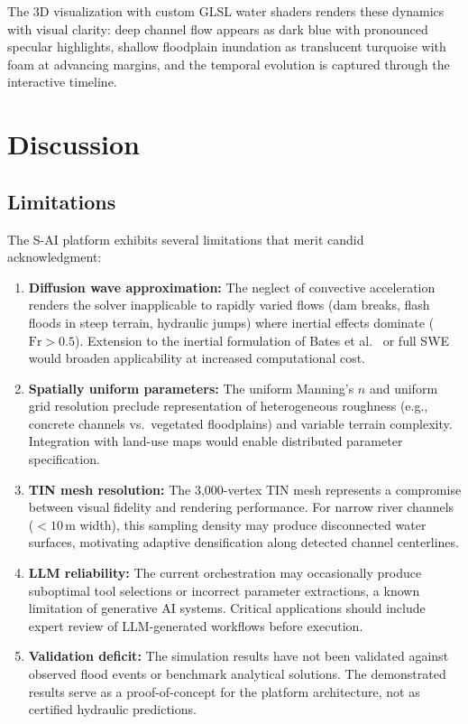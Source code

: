 \documentclass[11pt, a4paper]{article}
\begin{document}
The 3D visualization with custom GLSL water shaders renders these dynamics with visual clarity: deep channel flow appears as dark blue with pronounced specular highlights, shallow floodplain inundation as translucent turquoise with foam at advancing margins, and the temporal evolution is captured through the interactive timeline.

\section{Discussion}
\label{sec:discuss}

\subsection{Limitations}

The S-AI platform exhibits several limitations that merit candid acknowledgment:

\begin{enumerate}[leftmargin=1.5em]
  \item \textbf{Diffusion wave approximation:} The neglect of convective acceleration renders the solver inapplicable to rapidly varied flows (dam breaks, flash floods in steep terrain, hydraulic jumps) where inertial effects dominate ($\mathrm{Fr} > 0.5$). Extension to the inertial formulation of Bates et al.~\cite{bates2010} or full SWE would broaden applicability at increased computational cost.

  \item \textbf{Spatially uniform parameters:} The uniform Manning's $n$ and uniform grid resolution preclude representation of heterogeneous roughness (e.g., concrete channels vs.\ vegetated floodplains) and variable terrain complexity. Integration with land-use maps would enable distributed parameter specification.

  \item \textbf{TIN mesh resolution:} The 3,000-vertex TIN mesh represents a compromise between visual fidelity and rendering performance. For narrow river channels ($<10$\,m width), this sampling density may produce disconnected water surfaces, motivating adaptive densification along detected channel centerlines.

  \item \textbf{LLM reliability:} The current orchestration may occasionally produce suboptimal tool selections or incorrect parameter extractions, a known limitation of generative AI systems. Critical applications should include expert review of LLM-generated workflows before execution.

  \item \textbf{Validation deficit:} The simulation results have not been validated against observed flood events or benchmark analytical solutions. The demonstrated results serve as a proof-of-concept for the platform architecture, not as certified hydraulic predictions.
\end{enumerate}
\end{document}
